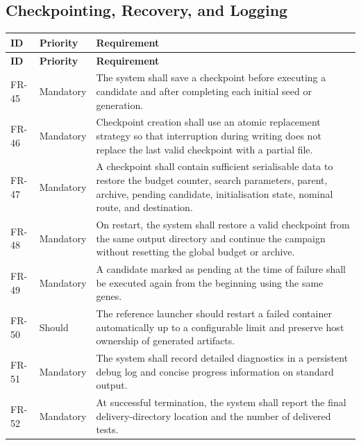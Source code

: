 \documentclass[11pt,a4paper,openany]{report}
\begin{document}
\subsection{Checkpointing, Recovery, and Logging}
\begin{longtable}{L{1.7cm} L{2.1cm} L{10.8cm}}
\toprule
\textbf{ID} & \textbf{Priority} & \textbf{Requirement}\\
\midrule
\endfirsthead
\toprule
\textbf{ID} & \textbf{Priority} & \textbf{Requirement}\\
\midrule
\endhead
FR-45 & Mandatory & The system shall save a checkpoint before executing a candidate and after completing each initial seed or generation.\\
FR-46 & Mandatory & Checkpoint creation shall use an atomic replacement strategy so that interruption during writing does not replace the last valid checkpoint with a partial file.\\
FR-47 & Mandatory & A checkpoint shall contain sufficient serialisable data to restore the budget counter, search parameters, parent, archive, pending candidate, initialisation state, nominal route, and destination.\\
FR-48 & Mandatory & On restart, the system shall restore a valid checkpoint from the same output directory and continue the campaign without resetting the global budget or archive.\\
FR-49 & Mandatory & A candidate marked as pending at the time of failure shall be executed again from the beginning using the same genes.\\
FR-50 & Should & The reference launcher should restart a failed container automatically up to a configurable limit and preserve host ownership of generated artifacts.\\
FR-51 & Mandatory & The system shall record detailed diagnostics in a persistent debug log and concise progress information on standard output.\\
FR-52 & Mandatory & At successful termination, the system shall report the final delivery-directory location and the number of delivered tests.\\
\bottomrule
\end{longtable}
\end{document}
